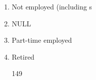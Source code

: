 \documentclass[]{article}
\providecommand{\tightlist}{%
  \setlength{\itemsep}{0pt}\setlength{\parskip}{0pt}}
\begin{document}
\begin{enumerate}
  44

  (

  18.5\%

  )

  89

  (

  37.4\%

  )

  2

  (

  0.8\%

  )

  3

  (

  1.3\%

  )

  17

  (

  7.1\%

  )

  2

  (

  0.8\%

  )

  4

  (

  1.7\%

  )

  70

  (

  29.4\%

  )

  1

  (

  0.4\%

  )

  6

  (

  2.5\%

  )

  0 (0.0\%)

  11

  Employment\_Status {[}character{]}

  \begin{enumerate}
  \def\labelenumii{\arabic{enumii}.}
  \tightlist
  \item
    Full time employed
  \end{enumerate}
\item
  Not employed (including s
\item
  NULL
\item
  Part-time employed
\item
  Retired

  149


\end{enumerate}
\end{document}
